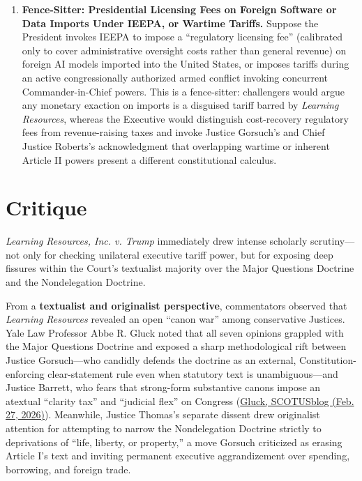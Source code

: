 \documentclass[12pt]{article}
\begin{document}
\begin{enumerate}
\item \textbf{Fence-Sitter: Presidential Licensing Fees on Foreign Software or Data Imports Under IEEPA, or Wartime Tariffs.} Suppose the President invokes IEEPA to impose a ``regulatory licensing fee'' (calibrated only to cover administrative oversight costs rather than general revenue) on foreign AI models imported into the United States, or imposes tariffs during an active congressionally authorized armed conflict invoking concurrent Commander-in-Chief powers. This is a fence-sitter: challengers would argue any monetary exaction on imports is a disguised tariff barred by \textit{Learning Resources}, whereas the Executive would distinguish cost-recovery regulatory fees from revenue-raising taxes and invoke Justice Gorsuch's and Chief Justice Roberts's acknowledgment that overlapping wartime or inherent Article II powers present a different constitutional calculus.
\end{enumerate}

\section{Critique}
\textit{Learning Resources, Inc. v. Trump} immediately drew intense scholarly scrutiny---not only for checking unilateral executive tariff power, but for exposing deep fissures within the Court's textualist majority over the Major Questions Doctrine and the Nondelegation Doctrine.

From a \textbf{textualist and originalist perspective}, commentators observed that \textit{Learning Resources} revealed an open ``canon war'' among conservative Justices. Yale Law Professor Abbe R. Gluck noted that all seven opinions grappled with the Major Questions Doctrine and exposed a sharp methodological rift between Justice Gorsuch---who candidly defends the doctrine as an external, Constitution-enforcing clear-statement rule even when statutory text is unambiguous---and Justice Barrett, who fears that strong-form substantive canons impose an atextual ``clarity tax'' and ``judicial flex'' on Congress (\href{https://www.scotusblog.com/2026/02/the-major-debate-over-major-questions-in-the-tariffs-decision-is-only-the-beginning/}{Gluck, SCOTUSblog (Feb. 27, 2026)}). Meanwhile, Justice Thomas's separate dissent drew originalist attention for attempting to narrow the Nondelegation Doctrine strictly to deprivations of ``life, liberty, or property,'' a move Gorsuch criticized as erasing Article I's text and inviting permanent executive aggrandizement over spending, borrowing, and foreign trade.
\end{document}
